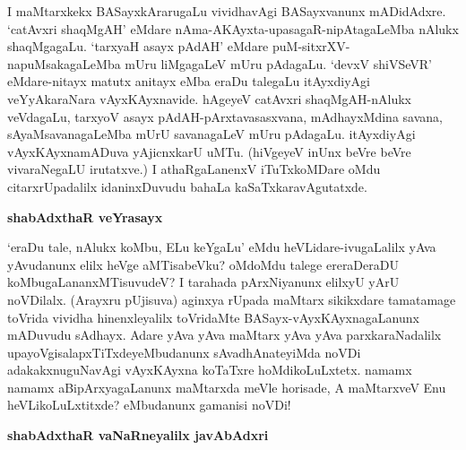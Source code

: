 I maMtarxkekx BASayxkArarugaLu vividhavAgi BASayxvanunx mADidAdxre. 
`catAvxri shaqMgAH' eMdare nAma-AKAyxta-upasagaR-nipAtagaLeMba nAlukx 
shaqMgagaLu. `tarxyaH asayx pAdAH' eMdare puM-sitxrXV-napuMsakagaLeMba 
mUru liMgagaLeV mUru pAdagaLu. `devxV shiVSeVR' eMdare-nitayx matutx 
anitayx eMba eraDu talegaLu itAyxdiyAgi veYyAkaraNara vAyxKAyxnavide. hAgeyeV catAvxri shaqMgAH-nAlukx veVdagaLu, tarxyoV asayx pAdAH-pArxtavasasxvana, mAdhayxMdina savana, sAyaMsavanagaLeMba mUrU savanagaLeV mUru pAdagaLu. itAyxdiyAgi vAyxKAyxnamADuva yAjicnxkarU uMTu. (hiVgeyeV inUnx beVre beVre vivaraNegaLU irutatxve.) I athaRgaLanenxV iTuTxkoMDare oMdu citarxrUpadalilx idaninxDuvudu bahaLa kaSaTxkaravAgutatxde.

{\bigskip
\noindent
{\large\bf shabAdxthaR veYrasayx}}\label{page112}
\medskip

\noindent
`eraDu tale, nAlukx koMbu, ELu keYgaLu' eMdu heVLidare-ivugaLalilx yAva 
yAvudanunx elilx heVge aMTisabeVku? oMdoMdu talege ereraDeraDU koMbugaLananxMTisuvudeV? I tarahada pArxNiyanunx elilxyU yArU noVDilalx. (Arayxru pUjisuva) aginxya rUpada maMtarx sikikxdare tamatamage toVrida vividha hinenxleyalilx toVridaMte BASayx-vAyxKAyxnagaLanunx mADuvudu sAdhayx. Adare yAva yAva maMtarx yAva yAva parxkaraNadalilx upayoVgisalapxTiTxdeyeMbudanunx sAvadhAnateyiMda noVDi adakakxnuguNavAgi vAyxKAyxna koTaTxre hoMdikoLuLxtetx. namamx namamx aBipArxyagaLanunx maMtarxda meVle horisade, A maMtarxveV Enu heVLikoLuLxtitxde? eMbudanunx gamanisi noVDi!

{\bigskip
\noindent
{\large\bf shabAdxthaR vaNaRneyalilx javAbAdxri}}\label{page112a}
\medskip

